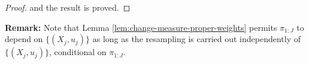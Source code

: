\begin{proof}
    and the result is proved. 



    
    
\end{proof}


\textbf{Remark:} Note that Lemma \ref{lem:change-measure-proper-weights} permits $\pi_{1:J}$ to depend on $\{(X_j,u_j)\}$ as long as the resampling is carried out independently of $\{(X_j,u_j)\}$, conditional on $\pi_{1:J}$.

